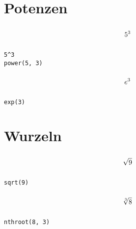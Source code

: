 \documentclass
[
  fontsize = 11pt,
  parskip  = half-,
  BCOR     = 0pt,
  DIV      = 11,
  ngerman
]
{scrartcl}
\begin{document}
\section{Potenzen}
\begin{minipage}{\mw}
  \begin{equation*}
    \vphantom{\bigg(}%
    5^3
  \end{equation*}
\end{minipage}%
\hfill
\begin{minipage}{\cw}
\begin{verbatim}
5^3
power(5, 3)
\end{verbatim}
\end{minipage}
\begin{minipage}{\mw}
  \begin{equation*}
    \vphantom{\bigg(}%
    e^{3}
  \end{equation*}
\end{minipage}%
\hfill
\begin{minipage}{\cw}
\begin{verbatim}
exp(3)
\end{verbatim}
\end{minipage}

\section{Wurzeln}
\begin{minipage}{\mw}
  \begin{equation*}
    \vphantom{\bigg(}%
    \sqrt{9}
  \end{equation*}
\end{minipage}%
\hfill
\begin{minipage}{\cw}
\begin{verbatim}
sqrt(9)
\end{verbatim}
\end{minipage}
\begin{minipage}{\mw}
  \begin{equation*}
    \vphantom{\bigg(}%
    \sqrt[3]{8}
  \end{equation*}
\end{minipage}%
\hfill
\begin{minipage}{\cw}
\begin{verbatim}
nthroot(8, 3)
\end{verbatim}
\end{minipage}

\end{document}
